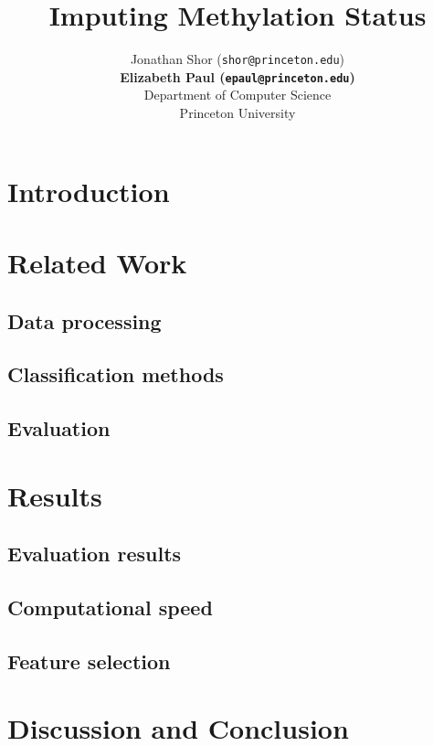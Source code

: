 \documentclass{article} %
\title{Imputing Methylation Status}
\author{
Jonathan Shor (\texttt{shor@princeton.edu})\\
\textbf{Elizabeth Paul (\texttt{epaul@princeton.edu})}\\
Department of Computer Science\\
Princeton University\\
}
\begin{document}
\maketitle

\begin{abstract}

\end{abstract}
\section{Introduction}


\section{Related Work}


\subsection{Data processing}

\subsection{Classification methods}

\subsection{Evaluation}

\section{Results}

\subsection{Evaluation results}

\subsection{Computational speed}

\subsection{Feature selection}

\section{Discussion and Conclusion}


\end{document}
